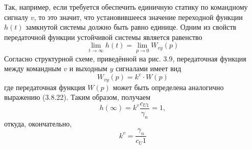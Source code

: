 Так, например, если требуется обеспечить единичную статику по командному сигналу $v$, то это значит, что установившееся значение переходной функции $h(t)$ замкнутой системы должно быть равно единице. Одним из свойств передаточной функции устойчивой системы является равенство
\begin{equation}
	\lim\limits_{t\to\infty}h(t)=\lim\limits_{p\to0}W_{vy}(p)
\end{equation}
Согласно структурной схеме, приведённой на  рис. 3.9, передаточная функция между командным $v$ и выходным $y$ сигналами имеет вид
\begin{equation}
	W_{vy}(p)=k^v\cdot W(p)
\end{equation}
где передаточная функция $W(p)$ может быть определена аналогично выражению (3.8.22). Таким образом, получаем
\begin{equation}
	h(\infty)=k^v\dfrac{c_{U1}}{\gamma_n}=1,
\end{equation}
откуда, окончательно,
\begin{equation}
	k^v=\dfrac{\gamma_n}{c_U1}
\end{equation}
\newpage